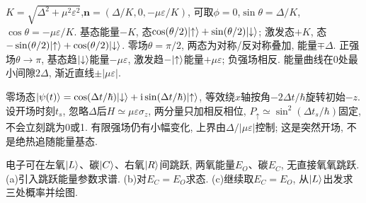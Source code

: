 \begin{solution}
$K=\sqrt{\Delta^2+\mu^2\varepsilon^2}$,$\boldsymbol n=(\Delta/K,0,-\mu\varepsilon/K)$, 可取$\phi=0$,$\sin\theta=\Delta/K$,$\cos\theta=-\mu\varepsilon/K$. 基态能量$-K$, 态$\cos(\theta/2)\lvert \uparrow\rangle+\sin(\theta/2)\lvert \downarrow\rangle$; 激发态$+K$, 态$-\sin(\theta/2)\lvert \uparrow\rangle+\cos(\theta/2)\lvert \downarrow\rangle$. 零场$\theta=\pi/2$, 两态为对称/反对称叠加, 能量$\mp\Delta$. 正强场$\theta\to\pi$, 基态趋$\lvert \downarrow\rangle$能量$-\mu\varepsilon$, 激发趋$-\lvert \uparrow\rangle$能量$+\mu\varepsilon$; 负强场相反. 能量曲线在0处最小间隙$2\Delta$, 渐近直线$\pm|\mu\varepsilon|$.
\begin{center}\end{center}
零场态$\lvert \psi(t)\rangle=\cos(\Delta t/\hbar)\lvert \downarrow\rangle+\mathrm i\sin(\Delta t/\hbar)\lvert \uparrow\rangle$, 等效绕$x$轴按角$-2\Delta t/\hbar$旋转初始$-z$. 设开场时刻$t_s$, 忽略$\Delta$后$H\simeq\mu\varepsilon\sigma_z$, 两分量只加相反相位, $P_\uparrow\simeq\sin^2(\Delta t_s/\hbar)$固定, 不会立刻跳为0或1. 有限强场仍有小幅变化, 上界由$\Delta/|\mu\varepsilon|$控制; 这是突然开场, 不是绝热追随能量基态.
\end{solution}
\begin{exercise}
电子可在左氧$\lvert L\rangle$、碳$\lvert C\rangle$、右氧$\lvert R\rangle$间跳跃, 两氧能量$E_O$、碳$E_C$, 无直接氧氧跳跃. (a)引入跳跃能量参数求谱. (b)对$E_C=E_O$求态. (c)继续取$E_C=E_O$, 从$\lvert L\rangle$出发求三处概率并绘图.
\end{exercise}
